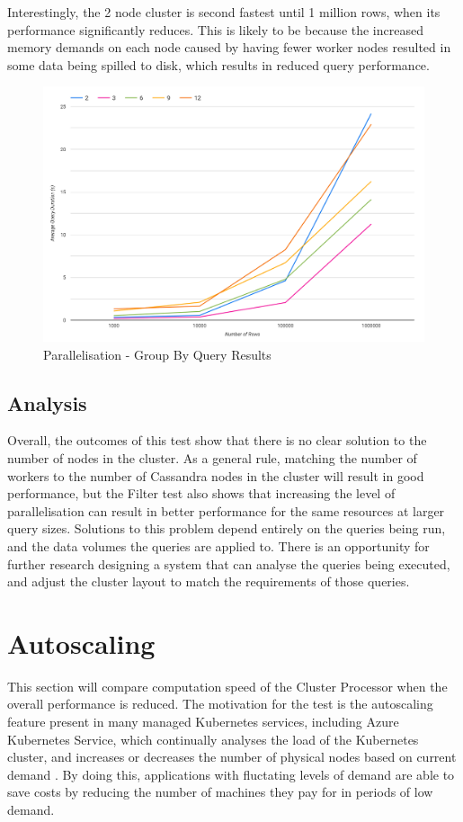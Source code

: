 Interestingly, the 2 node cluster is second fastest until 1 million rows, when its performance significantly reduces. This is likely to be because the increased memory demands on each node caused by having fewer worker nodes resulted in some data being spilled to disk, which results in reduced query performance.

\begin{figure}[ht]
	\centering
	\includegraphics[width=0.8\linewidth]{chapters/diagrams/testing/group-by-simple-parallelisation-test}
	\caption{Parallelisation - Group By Query Results}
	\label{fig:group-by-simple-parallelisation-test}
\end{figure}

\subsection{Analysis}
Overall, the outcomes of this test show that there is no clear solution to the number of nodes in the cluster. As a general rule, matching the number of workers to the number of Cassandra nodes in the cluster will result in good performance, but the Filter test also shows that increasing the level of parallelisation can result in better performance for the same resources at larger query sizes. Solutions to this problem depend entirely on the queries being run, and the data volumes the queries are applied to. There is an opportunity for further research designing a system that can analyse the queries being executed, and adjust the cluster layout to match the requirements of those queries.

\section{Autoscaling}
This section will compare computation speed of the Cluster Processor when the overall performance is reduced. The motivation for the test is the autoscaling feature present in many managed Kubernetes services, including Azure Kubernetes Service, which continually analyses the load of the Kubernetes cluster, and increases or decreases the number of physical nodes based on current demand \cite{aksautoscaling}. By doing this, applications with fluctating levels of demand are able to save costs by reducing the number of machines they pay for in periods of low demand.

